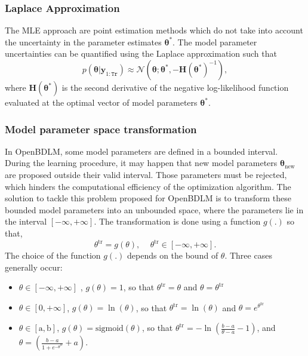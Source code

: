 \subsubsection{Laplace Approximation}

The MLE approach are point estimation methods which do not take into account the uncertainty in the parameter estimates $\bm\theta^{*}$. 
The model parameter uncertainties can be quantified using the Laplace approximation \cite{gelman2014bayesian} such that
$$p(\bm\theta|\mathbf{y}_{1:\mathtt{Tr}})  \approx  \mathcal{N}\left(\bm\theta;\bm\theta^{*},-\mathbf{H}(\bm\theta^{*})^{-1}\right),
\label{EQ: LaA}
$$
where $\mathbf{H}(\bm\theta^{*})$ is the second derivative of the negative log-likelihood function evaluated at the optimal vector of model parameters $\bm\theta^{*}$. 

\subsubsection{Model parameter space transformation}
\label{SS:THSpaceTransformation}

In OpenBDLM, some model parameters  are defined in a bounded interval. During the learning procedure, it may happen that new model parameters $\bm\theta_{\text{new}}$ are proposed outside their valid interval.
Those parameters must be rejected, which hinders the computational efficiency of the optimization algorithm.
The solution to tackle this problem proposed for OpenBDLM is to transform these bounded model parameters into an unbounded space, where the parameters lie in the interval $[ -\infty, +\infty ]$. The transformation is done using a function $g(.)$ so that, 
\begin{equation}
\theta^{\text{tr}} = g(\theta) \text{, }\quad \theta^{\text{tr}} \in [-\infty, +\infty ] \text{.}
\end{equation}
The choice of the function $g(.)$ depends on the bound of $\theta$. 
Three cases generally occur:
\begin{itemize}
\item $ \theta \in [-\infty, +\infty ]$ , $g(\theta) = 1$, so that $\theta^{\text{tr}} = \theta$ and $\theta = \theta^{\text{tr}} $
\item $ \theta \in [0, +\infty ]$, $g(\theta) = \ln(\theta)$, so that $\theta^{\text{tr}} = \ln(\theta) $ and $\theta = e^{\theta^{\text{tr}}} $
\item $ \theta \in [\text{a}, \text{b}]$, $g(\theta) = \text{sigmoid}(\theta)$, so that $\theta^{\text{tr}} = -\ln \left( \frac{b-a}{\theta-a} - 1\right) $, and $\theta = \left( \frac{b-a}{1+e^{-\theta^{\text{tr}}}} + a \right).$
\end{itemize}

